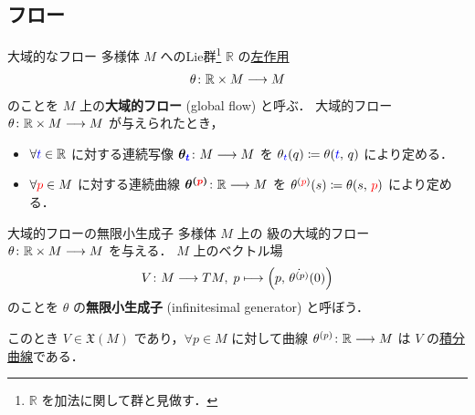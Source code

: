 \documentclass[geometry_main]{subfiles}
\begin{document}
\subsection{フロー}

\begin{mydef}[label=def:global-flow]{大域的なフロー}
    \cinfty 多様体 $M$ へのLie群\footnote{$\mathbb{R}$ を加法に関して群と見做す．} $\mathbb{R}$ の\hyperref[def:Lie-action]{左作用}
    \begin{align}
        \theta \colon \mathbb{R} \times M \longrightarrow M
    \end{align}
    のことを $M$ 上の\textbf{大域的フロー} (global flow) と呼ぶ．
    \tcblower
    大域的フロー $\theta \colon \mathbb{R} \times M \longrightarrow M$ が与えられたとき，
    \begin{itemize}
        \item $\forall \textcolor{blue}{t} \in \mathbb{R}$ に対する連続写像 $\bm{\theta_{\textcolor{blue}{t}}} \colon M \longrightarrow M$ を $\theta_{\textcolor{blue}{t}}(q) \coloneqq \theta(\textcolor{blue}{t},\, q)$ により定める．
        \item $\forall \textcolor{red}{p} \in M$ に対する連続曲線 $\bm{\theta^{(\textcolor{red}{p})}} \colon \mathbb{R} \longrightarrow M$ を $\theta^{(\textcolor{red}{p})}(s) \coloneqq \theta(s,\, \textcolor{red}{p})$ により定める．
    \end{itemize}
\end{mydef}

\begin{myprop}[label=prop:infinitesimal-generator]{大域的フローの無限小生成子}
    \cinfty 多様体 $M$ 上の \cinfty 級の大域的フロー $\theta \colon \mathbb{R} \times M \longrightarrow M$ を与える．
    $M$ 上のベクトル場
    \begin{align}
        V \colon M \longrightarrow TM,\; p \longmapsto \left( p,\, \dot{\theta^{(p)}} (0)  \right) 
    \end{align}
    のことを $\theta$ の\textbf{無限小生成子} (infinitesimal generator) と呼ぼう．

    このとき $V \in \mathfrak{X}(M)$ であり，$\forall p \in M$ に対して\cinfty 曲線 $\theta^{(p)} \colon \mathbb{R} \longrightarrow M$ は $V$ の\hyperref[def:integral-curve]{積分曲線}である．
\end{myprop}
\end{document}
